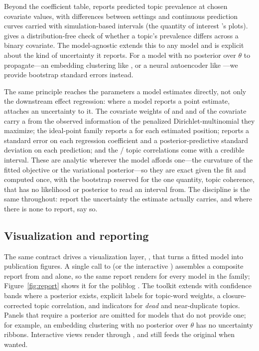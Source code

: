 \documentclass[article]{jss}
\begin{document}
Beyond the coefficient table,  reports predicted
topic prevalence at chosen covariate values, with differences between settings and
continuous prediction curves carried with simulation-based intervals (the
quantity of interest 's  plots).
 gives a distribution-free check of whether a
topic's prevalence differs across a binary covariate. The model-agnostic
 extends this to any model and is explicit about the
kind of uncertainty it reports. For a model with no posterior over $\theta$ to
propagate---an embedding clustering like , or a neural autoencoder
like ---we provide bootstrap standard errors instead.

The same principle reaches the parameters a model estimates directly, not only
the downstream effect regression: where a model reports a point estimate,
 attaches an uncertainty to it. The covariate weights of 
and  and of the covariate  carry a 
from the observed information of the penalized Dirichlet-multinomial they
maximize; the ideal-point family reports a  for each estimated
position;  reports a standard error on each regression
coefficient and a posterior-predictive standard deviation on each prediction; and
the / topic correlations come with a credible interval. These
are analytic wherever the model affords one---the curvature of the fitted
objective or the variational posterior---so they are exact given the fit and
computed once, with the bootstrap reserved for the one quantity, topic coherence,
that has no likelihood or posterior to read an interval from. The discipline is
the same throughout: report the uncertainty the estimate actually carries, and
where there is none to report, say so.

\subsection{Visualization and reporting}

The same contract drives a visualization layer, , that turns a
fitted model into publication figures. A single call to 
(or the interactive ) assembles a composite report from
 and  alone, so the same report renders for
every model in the family; Figure~\ref{fig:report} shows it for the poliblog
. The toolkit extends  \citep{sievert2014ldavis} with
confidence bands where a posterior exists, explicit labels for topic-word
weights, a closure-corrected topic correlation, and indicators for \emph{dead}
and near-duplicate topics. Panels that require a posterior are omitted for
models that do not provide one; for example, an embedding clustering with no
posterior over $\theta$ has no uncertainty ribbons. Interactive views render through , and
 still feeds the original  when wanted.
\end{document}
